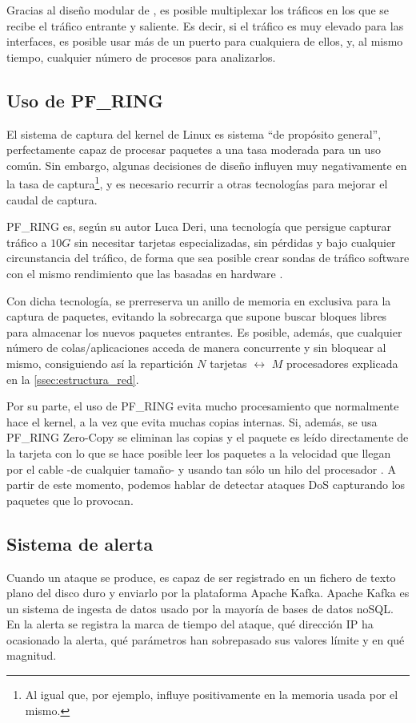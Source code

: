 Gracias al diseño modular de \redborderddos, es posible multiplexar los tráficos en los
que se recibe el tráfico entrante y saliente. Es decir, si el tráfico es muy elevado para
las interfaces, es posible usar más de un puerto para cualquiera de ellos, y, al mismo tiempo,
cualquier número de procesos para analizarlos.

\subsection{Uso de PF\_RING}
El sistema de captura del kernel de Linux es sistema ``de propósito general'', perfectamente capaz de
procesar paquetes a una tasa moderada para un uso común. Sin embargo,
algunas decisiones de diseño influyen muy negativamente en la tasa de captura\footnote{Al igual que,
por ejemplo, influye positivamente en la memoria usada por el mismo.}, y es necesario recurrir
a otras tecnologías para mejorar el caudal de captura.

PF\_RING es, según su autor Luca Deri, una tecnología que 
persigue capturar tráfico a $10G$ sin necesitar tarjetas especializadas, sin pérdidas y bajo cualquier
circunstancia del tráfico, de forma que sea posible crear sondas de tráfico software con el mismo 
rendimiento que las basadas en hardware \cite{LucaDeriPFRING}. %

Con dicha tecnología, se prerreserva un anillo de memoria en exclusiva para la captura de paquetes,
evitando la sobrecarga que supone buscar bloques libres para almacenar los nuevos paquetes entrantes.
Es posible, además, que cualquier número de colas/aplicaciones acceda de manera concurrente y sin bloquear al mismo,
consiguiendo así la repartición $N$ tarjetas $\leftrightarrow$ $M$ procesadores explicada en
la \autoref{ssec:estructura_red}.

Por su parte, el uso de PF\_RING evita mucho procesamiento que normalmente hace el kernel, a la vez que evita
muchas copias internas. Si, además, se usa PF\_RING Zero-Copy se eliminan las copias y el paquete es leído
directamente de la tarjeta con lo que se hace posible leer los paquetes a la velocidad que llegan por
el cable -de cualquier tamaño- y usando tan sólo un hilo del procesador \cite{PFRingZc}. A partir de este momento,
podemos hablar de detectar ataques \gls{DoS} capturando los paquetes que lo provocan.

\subsection{Sistema de alerta}
Cuando un ataque se produce, \redborderddos{} es capaz de ser registrado en un fichero de texto
plano del disco duro y enviarlo por la plataforma Apache Kafka.
Apache Kafka es un sistema
de ingesta de datos usado por la mayoría de bases de datos noSQL. En la 
alerta se registra la marca de tiempo del ataque, qué dirección IP ha ocasionado la alerta,
qué parámetros han sobrepasado sus valores límite y en qué magnitud.

